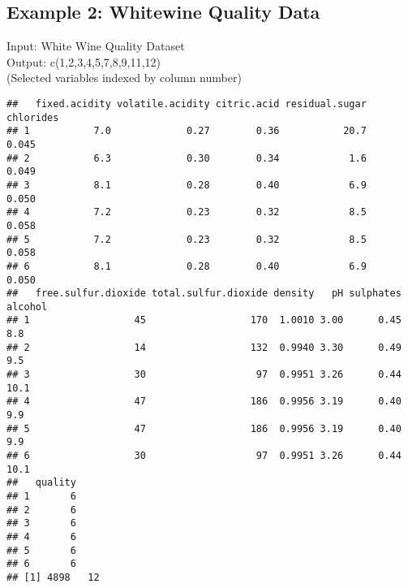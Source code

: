 \documentclass{article}\usepackage[]{graphicx}\usepackage[]{color}
\makeatletter
\newenvironment{kframe}{%
 \def\at@end@of@kframe{}%
 \ifinner\ifhmode%
  \def\at@end@of@kframe{\end{minipage}}%
  \begin{minipage}{\columnwidth}%
 \fi\fi%
 \def\FrameCommand##1{\hskip\@totalleftmargin \hskip-\fboxsep
 \colorbox{shadecolor}{##1}\hskip-\fboxsep
     \hskip-\linewidth \hskip-\@totalleftmargin \hskip\columnwidth}%
 \MakeFramed {\advance\hsize-\width
   \@totalleftmargin\z@ \linewidth\hsize
   \@setminipage}}%
 {\par\unskip\endMakeFramed%
 \at@end@of@kframe}
\newenvironment{knitrout}{}{} %
\makeatother
\begin{document}
\subsection{Example 2: Whitewine Quality Data}
Input: White Wine Quality Dataset\\
Output: c(1,2,3,4,5,7,8,9,11,12)\\
(Selected variables indexed by column number)\\
\begin{knitrout}
\color{fgcolor}\begin{kframe}
\begin{verbatim}
##   fixed.acidity volatile.acidity citric.acid residual.sugar chlorides
## 1           7.0             0.27        0.36           20.7     0.045
## 2           6.3             0.30        0.34            1.6     0.049
## 3           8.1             0.28        0.40            6.9     0.050
## 4           7.2             0.23        0.32            8.5     0.058
## 5           7.2             0.23        0.32            8.5     0.058
## 6           8.1             0.28        0.40            6.9     0.050
##   free.sulfur.dioxide total.sulfur.dioxide density   pH sulphates alcohol
## 1                  45                  170  1.0010 3.00      0.45     8.8
## 2                  14                  132  0.9940 3.30      0.49     9.5
## 3                  30                   97  0.9951 3.26      0.44    10.1
## 4                  47                  186  0.9956 3.19      0.40     9.9
## 5                  47                  186  0.9956 3.19      0.40     9.9
## 6                  30                   97  0.9951 3.26      0.44    10.1
##   quality
## 1       6
## 2       6
## 3       6
## 4       6
## 5       6
## 6       6
## [1] 4898   12
\end{verbatim}
\end{kframe}
\end{knitrout}
\end{document}
